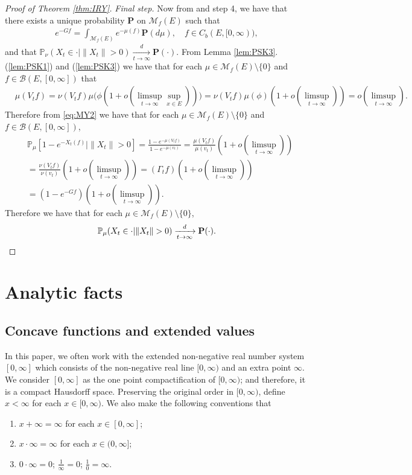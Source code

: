 \documentclass[12pt,a4paper]{amsart}
\numberwithin{equation}{section}
\theoremstyle{plain}
\theoremstyle{definition}
\begin{document}
\begin{proof}[Proof of Theorem \ref{thm:IRY}]
\emph{Final step.}
Now from \cite[Proposition 1.19]{Li2011MeasureValued} and step 4, we have that there exists a unique probability $\mathbf P$ on $\mathcal M_f(E)$ such that 
\begin{align}
  e^{-Gf}
  = \int_{\mathcal M_f(E)} e^{- \mu(f)} \mathbf P(d\mu)
  , \quad f\in C_b (E, [0,\infty)),
\end{align}
and that
\(	
\mathbb P_{\nu}(X_t \in \cdot | \|X_t\|>0 ) 
  \xrightarrow[t\to \infty]{d} \mathbf P(\cdot).
\)
From Lemma \ref{lem:PSK3}.(\ref{lem:PSK1}) and (\ref{lem:PSK3}) we have that for each $\mu \in \mathcal M_f(E)\setminus \{0\}$ and $f \in \mathcal B(E,[0,\infty])$ that 
\begin{align}
	& \mu(V_tf) = \nu(V_tf) \mu\Big(\phi(1+o(\limsup_{t\to \infty}\sup_{x\in E})) \Big)
   = \nu(V_tf) \mu(\phi)(1+o(\limsup_{t\to \infty}))
   = o(\limsup_{t\to \infty}).
\end{align}
Therefore from \eqref{eq:MY2} we have that for each $\mu \in \mathcal M_f(E)\setminus\{0\}$ and $f\in \mathcal B(E,[0,\infty])$, 
\begin{align}
  &\mathbb P_\mu[1 - e^{-X_t(f)}|\|X_t\|>0]
  = \frac{1 - e^{- \mu(V_tf)}}{1 - e^{-\mu(v_t)}}
  = \frac{\mu(V_tf)}{\mu(v_t)} (1+o(\limsup_{t\to \infty}))
  \\&= \frac{\nu(V_tf)}{\nu(v_t)}(1+o(\limsup_{t\to \infty})) 
  = (\Gamma_t f)(1+o(\limsup_{t\to \infty}))
  \\ & = (1 - e^{-Gf}) (1+o(\limsup_{t\to \infty})).
\end{align}
Therefore we have that for each $\mu \in \mathcal M_f(E)\setminus\{0\}$,
\[
  \mathbb P_\mu(X_t \in \cdot | \|X_t\|>0)
  \xrightarrow[t\to \infty]{d} \mathbf P(\cdot).
  \qedhere
\]
\end{proof}

\appendix
\section{Analytic facts}
\subsection{Concave functions and extended values}
In this paper, we often work with the extended non-negative real number system $[0,\infty]$ which consists of the non-negative real line $[0,\infty)$ and an extra point $\infty$. 
We consider $[0,\infty]$ as the one point compactification of $[0,\infty)$; and therefore, it is a compact Hausdorff space.
Preserving the original order in $[0,\infty)$, define $x < \infty$ for each $x\in [0,\infty)$.
We also make the following conventions that 
\begin{enumerate}
\item
$x + \infty = \infty$ for each $x\in [0,\infty]$; 
\item
$x \cdot \infty = \infty$ for each $x\in (0,\infty]$;
\item
$0 \cdot \infty = 0$; $\frac{1}{\infty} = 0$; $\frac{1}{0} = \infty$.
\end{enumerate}
\end{document}
